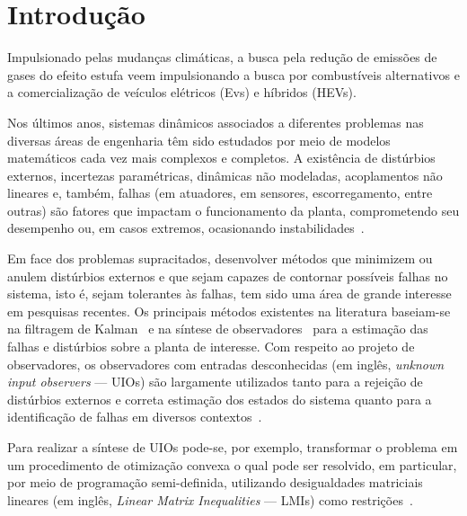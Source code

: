 \documentclass[11pt,a4paper]{article}
\begin{document}


\section{Introdução}

Impulsionado pelas mudanças climáticas, a busca pela redução de emissões de gases do 
efeito estufa veem impulsionando a busca por combustíveis alternativos e a 
comercialização de veículos elétricos (Evs) e híbridos (HEVs).

Nos últimos anos, sistemas dinâmicos associados a diferentes problemas
nas diversas áreas de engenharia têm sido estudados por meio de
modelos matemáticos cada vez mais complexos e completos. A existência
de distúrbios externos, incertezas paramétricas, dinâmicas não
modeladas, acoplamentos não lineares e, também, falhas (em atuadores, em
sensores, escorregamento, entre outras) são fatores que impactam o
funcionamento da planta, comprometendo seu desempenho ou, em casos
extremos, ocasionando instabilidades~\cite{XG:00,GC:14,LYCC:16}.


Em face dos problemas supracitados, desenvolver métodos que minimizem
ou anulem distúrbios externos e que sejam capazes de contornar
possíveis falhas no sistema, isto é, sejam tolerantes às falhas, tem
sido uma área de grande interesse em pesquisas recentes. Os principais
métodos existentes na literatura baseiam-se na filtragem de
Kalman~\cite{YCY:05,CH:16} e na síntese de 
observadores~\cite{LM:90,FF:12,WJ:13,ZDZ:16,CYGL:16} para a estimação
das falhas e distúrbios sobre a planta de interesse. Com respeito ao
projeto de observadores, os observadores com entradas desconhecidas
(em inglês, \emph{unknown input observers} --- UIOs) são largamente
utilizados tanto para a rejeição de distúrbios externos e correta
estimação dos estados do sistema quanto para a identificação de falhas
em diversos
contextos~\cite{TP:99a,Koe:05,Koe:06,LGBdS:11,IM:15,CYGL:16}.

Para realizar a síntese de UIOs pode-se, por exemplo, transformar o
problema em um procedimento de otimização convexa o qual pode ser
resolvido, em particular, por meio de programação semi-definida,
utilizando desigualdades matriciais lineares (em inglês, \emph{Linear
  Matrix Inequalities} --- LMIs) como
restrições~\cite{BEFB:94,EN:00,B-TEN:00}.
\end{document}
